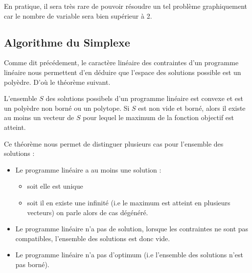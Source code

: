 \begin{remark}
    En pratique, il sera très rare de pouvoir résoudre un tel problème graphiquement car le nombre de variable sera 
    bien supérieur à 2. 
\end{remark}


\subsection{Algorithme du Simplexe}

Comme dit précédement, le caractère linéaire des contraintes d'un programme linéaire nous permettent 
d'en déduire que l'espace des solutions possible est un polyèdre. D'où le théorème suivant. 

\begin{theorem}
    L'ensemble $S$ des solutions possibels d'un programme linéaire est convexe et est un polyèdre non borné 
    ou un polytope. Si $S$ est non vide et borné, alors il existe au moins un vecteur de $S$ pour lequel 
    le maximum de la fonction objectif est atteint.  
\end{theorem}

\begin{remark}
    Ce théorème nous permet de distinguer plusieurs cas pour l'ensemble des solutions : 
    \begin{itemize}
        \item Le programme linéaire a au moins une solution : 
            \begin{itemize}
                \item soit elle est unique 
                \item soit il en existe une infinité (i.e le maximum est atteint en plusieurs vecteurs) on parle 
                alors de cas dégénéré. 
            \end{itemize}
        \item Le programme linéaire n'a pas de solution, lorsque les contraintes ne sont pas compatibles, 
        l'ensemble des solutions est donc vide. 
        \item Le programme linéaire n'a pas d'optimum (i.e l'ensemble des solutions n'est pas borné).
    \end{itemize}
\end{remark}

